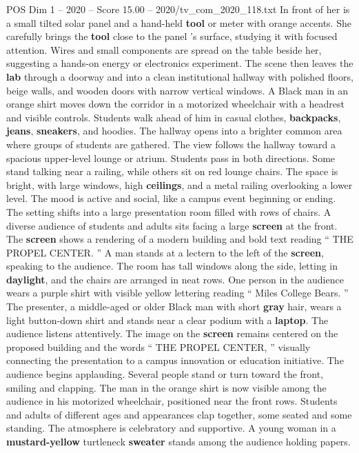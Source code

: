 \begin{textsample}{POS Dim 1 – 2020 – Score 15.00 – 2020/tv\_com\_2020\_118.txt}
In front of her is a small tilted solar panel and a hand-held \textbf{tool} or meter with orange accents.
She carefully brings the \textbf{tool} close to the panel ’s surface, studying it with focused attention.
Wires and small components are spread on the table beside her, suggesting a hands-on energy or electronics experiment.
The scene then leaves the \textbf{lab} through a doorway and into a clean institutional hallway with polished floors, beige walls, and wooden doors with narrow vertical windows.
A Black man in an orange shirt moves down the corridor in a motorized wheelchair with a headrest and visible controls.
Students walk ahead of him in casual clothes, \textbf{backpacks}, \textbf{jeans}, \textbf{sneakers}, and hoodies.
The hallway opens into a brighter common area where groups of students are gathered.
The view follows the hallway toward a spacious upper-level lounge or atrium.
Students pass in both directions.
Some stand talking near a railing, while others sit on red lounge chairs.
The space is bright, with large windows, high \textbf{ceilings}, and a metal railing overlooking a lower level.
The mood is active and social, like a campus event beginning or ending.
The setting shifts into a large presentation room filled with rows of chairs.
A diverse audience of students and adults sits facing a large \textbf{screen} at the front.
The \textbf{screen} shows a rendering of a modern building and bold text reading “ THE PROPEL CENTER. ” A man stands at a lectern to the left of the \textbf{screen}, speaking to the audience.
The room has tall windows along the side, letting in \textbf{daylight}, and the chairs are arranged in neat rows.
One person in the audience wears a purple shirt with visible yellow lettering reading “ Miles College Bears. ” The presenter, a middle-aged or older Black man with short \textbf{gray} hair, wears a light button-down shirt and stands near a clear podium with a \textbf{laptop}.
The audience listens attentively.
The image on the \textbf{screen} remains centered on the proposed building and the words “ THE PROPEL CENTER, ” visually connecting the presentation to a campus innovation or education initiative.
The audience begins applauding.
Several people stand or turn toward the front, smiling and clapping.
The man in the orange shirt is now visible among the audience in his motorized wheelchair, positioned near the front rows.
Students and adults of different ages and appearances clap together, some seated and some standing.
The atmosphere is celebratory and supportive.
A young woman in a \textbf{mustard-yellow} turtleneck \textbf{sweater} stands among the audience holding papers.

\end{textsample}
